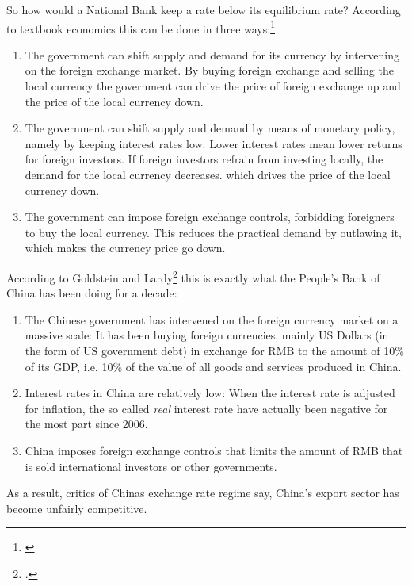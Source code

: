 So how would a National Bank keep a rate below its equilibrium rate? According to 
textbook economics this can be done in three ways:\footnote{\cite[pp. 
514]{Krugman2008}}

\begin{enumerate}
\item{The government can shift supply and demand for its currency by 
	intervening on the foreign exchange market. By buying foreign 
exchange and selling the local currency the government can drive the 
price of foreign exchange up and the price of the local currency down.}
\item{The government can shift supply and demand by means of monetary 
	policy, namely by keeping interest rates low. Lower interest rates 
mean lower returns for foreign investors. If foreign investors refrain 
from investing locally, the demand for the local currency decreases.  
which drives the price of the local currency down.}
\item{The government can impose foreign exchange controls, forbidding 
	foreigners to buy the local currency. This reduces the practical 
demand by outlawing it, which makes the currency price go down.}
\end{enumerate}

According to Goldstein and Lardy\footnote{\cite[pp.  
40]{Goldstein2008}.} this is exactly what the People's Bank of 
China has been doing for a decade:

\begin{enumerate}
\item{The Chinese government has intervened on the foreign currency 
		market on a massive scale: It has been buying foreign 
		currencies, mainly US Dollars (in the form of US government 
		debt) in exchange for RMB to the amount of 10\% of its GDP, i.e. 
		10\% of the value of all goods and services produced in China.} 
	\item{Interest rates in China are relatively low: When the interest 
		rate is adjusted for inflation, the so called \emph{real} 
	interest rate have actually been negative for the most part since 
2006.}
\item{China imposes foreign exchange controls that limits the amount of RMB that is sold international investors or other governments.}
\end{enumerate}

As a result, critics of Chinas exchange rate regime say, China's export 
sector has become unfairly competitive. 

